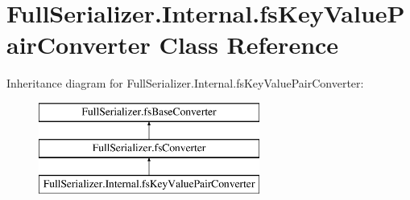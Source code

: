 \hypertarget{class_full_serializer_1_1_internal_1_1fs_key_value_pair_converter}{}\section{Full\+Serializer.\+Internal.\+fs\+Key\+Value\+Pair\+Converter Class Reference}
\label{class_full_serializer_1_1_internal_1_1fs_key_value_pair_converter}
Inheritance diagram for Full\+Serializer.\+Internal.\+fs\+Key\+Value\+Pair\+Converter\+:\begin{figure}[H]
\begin{center}
\leavevmode
\includegraphics[height=3.000000cm]{class_full_serializer_1_1_internal_1_1fs_key_value_pair_converter}
\end{center}
\end{figure}
